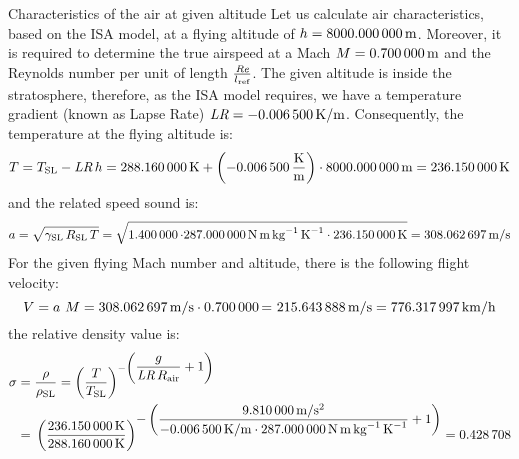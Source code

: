 \documentclass[[12pt,twoside]{book}
\begin{document}
%

%
\begin{myExampleX}{Characteristics of the air at given altitude}{}%
\label{example:Characteristics:Of:The:Air:At:A:Certain:Altitude}
%
\noindent
Let us calculate air characteristics, based on the ISA model, at a flying altitude of $h=\SI[round-precision=0]{\myAltitudeM}{m}$.
% 
Moreover, it is required to determine the true airspeed at a Mach $M=\SI[round-precision=2]{\myMachnumber}{m}$ and the Reynolds number per unit of length $\frac{\text{\itshape Re} }{l_\text{ref}}$. The given altitude is inside the stratosphere, therefore, as the ISA model requires, we have a temperature gradient (known as Lapse Rate) $\text{\itshape LR}=\SI[round-precision=4]{\myTemperaturegradient}{K/m}$.
Consequently, the temperature at the flying altitude is:
\[
T = {T_\text{SL}- \text{\itshape LR} \, h   
    = \SI[round-precision=2]{\myTemperaturesealevelK}{K}
        + \left( \SI[round-precision=4]{\myTemperaturegradient}{\frac{K}{m}} \right) \cdot\SI[round-precision=0]{\myAltitudeM}{m} } 
    = \SI[round-precision=1]{\myTemperatureK}{K}
\]
and the related speed sound is:
\[
a =\sqrt{
    \gamma_\text{SL} \, R_\text{SL} \,T}
    = \sqrt{
        \SI[round-precision=1]{\myAdiabaticindex} \cdot
        \SI[round-precision=0]{\myAirspecificconstant}{N\,m\,kg^{-1}\,K^{-1}} \cdot
        \SI[round-precision=2]{\myTemperatureK}{K}} 
    = \SI[round-precision=2]{\mySoundspeed}{m/s}
\]
\noindent
%
For the given flying Mach number and altitude, there is the following flight velocity:
\[
 V = {a }~{M} =\SI[round-precision=2]{\mySoundspeed}{m/s} \cdot \SI[round-precision=2]{\myMachnumber}= ~\SI[round-precision=2]{\mySpeedMs}{m/s} = \SI[round-precision=2]{\mySpeedkmh}{km/h} 
 \]
the relative density value is:
\[
\begin{split}
\sigma 
    & ={} \frac{\rho}{\rho_\text{SL}} = 
    \left( \frac{T}{T_\text{SL} } \right)^{
        -\left(\displaystyle \dfrac{ g }{\textit{LR}\, R_\text{air}} + 1 \right)
        } 
    \\ 
    & ={} \left(\frac{
        \SI[round-precision=2]{\myTemperatureK}{K} 
        }{
        \SI[round-precision=2]{\myTemperaturesealevelK}{K}
        }\right)^{\displaystyle
            -\left( \dfrac{
                \SI[round-precision=2]{\myGravitationalacceleration}{m/s^2}
                }{
                \SI[round-precision=4]{\myTemperaturegradient}{K/m}
                \cdot
                \SI[round-precision=0]{\myAirspecificconstant}{N\,m\,kg^{-1}\,K^{-1}}
                }{}
            + 1 \right)
        }
        = \SI[round-precision=3]{\myRelativedensity}{}
\end{split}
\]


\end{myExampleX}
\end{document}

